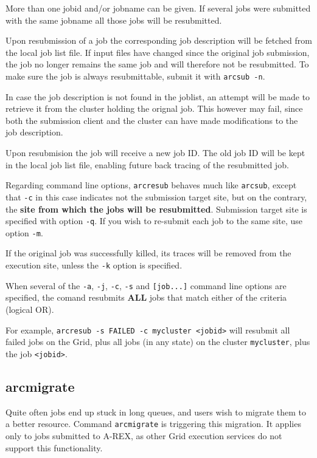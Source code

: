 More  than  one  jobid and/or jobname can be given. If several
jobs were submitted with the same jobname all those jobs will be resubmitted.

Upon resubmission of a job the corresponding job description will be
fetched from the local job list file. If input files have changed since the
original job submission, the job no longer remains the same job
and will therefore not be resubmitted. To make sure the job is always resubmittable,
submit it with \verb#arcsub -n#.

In case the job description is not found in the joblist, an attempt will be made to
retrieve it from the cluster holding the orignal job.  This however
may fail, since both the submission client and
the cluster can have made modifications to the job description.

Upon resubmision the job will receive a new job ID. The old job ID will be kept
in the local job list file, enabling future back tracing of the resubmitted job.

Regarding command line options, \verb#arcresub# behaves much like \verb#arcsub#, except that
\verb#-c# in this case indicates not the submission target site, but on the contrary, the \textbf{site
from which the jobs will be resubmitted}. Submission target site is specified with
option \verb#-q#. If you wish to re-submit each job to the same site, use option \verb#-m#.

If the original job was successfully killed, its traces will be removed from the execution site,
unless the \verb#-k# option is specified.

\begin{framed}
  When several of the \verb#-a#,  \verb#-j#, \verb#-c#, \verb#-s# and \verb#[job...]#
  command line options are specified, the comand resubmits \textbf{ALL} jobs that
  match either of the criteria (logical OR).

  For example, \verb#arcresub -s FAILED -c mycluster <jobid># will resubmit all failed
  jobs on the Grid, plus all jobs (in any state) on the cluster \verb#mycluster#, plus the job \verb#<jobid>#.
\end{framed}


\subsection{arcmigrate}
\label{sec:arcmigrate}

Quite often jobs end up stuck in long queues, and users wish to migrate them to a better
resource. Command \texttt{arcmigrate} is
triggering this migration. It applies only to jobs submitted to A-REX, as other Grid
execution services do not support this functionality.

